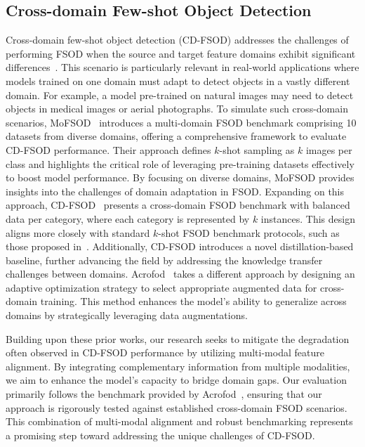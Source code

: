 \subsection{Cross-domain Few-shot Object Detection}
Cross-domain few-shot object detection (CD-FSOD) addresses the challenges of performing FSOD when the source and target feature domains exhibit significant differences~\cite{rostami2019sar,fu2025cross}. This scenario is particularly relevant in real-world applications where models trained on one domain must adapt to detect objects in a vastly different domain. For example, a model pre-trained on natural images may need to detect objects in medical images or aerial photographs.
To simulate such cross-domain scenarios, MoFSOD~\cite{Lee22Rethink} introduces a multi-domain FSOD benchmark comprising 10 datasets from diverse domains, offering a comprehensive framework to evaluate CD-FSOD performance. Their approach defines \( k \)-shot sampling as \( k \) images per class and highlights the critical role of leveraging pre-training datasets effectively to boost model performance. By focusing on diverse domains, MoFSOD provides insights into the challenges of domain adaptation in FSOD.
Expanding on this approach, CD-FSOD~\cite{Xiong2023CDFSOD} presents a cross-domain FSOD benchmark with balanced data per category, where each category is represented by \( k \) instances. This design aligns more closely with standard \( k \)-shot FSOD benchmark protocols, such as those proposed in~\cite{Wang20TFA}. Additionally, CD-FSOD introduces a novel distillation-based baseline, further advancing the field by addressing the knowledge transfer challenges between domains.
Acrofod~\cite{Gao22CDFSOD} takes a different approach by designing an adaptive optimization strategy to select appropriate augmented data for cross-domain training. This method enhances the model's ability to generalize across domains by strategically leveraging data augmentations.

Building upon these prior works, our research seeks to mitigate the degradation often observed in CD-FSOD performance by utilizing multi-modal feature alignment. By integrating complementary information from multiple modalities, we aim to enhance the model's capacity to bridge domain gaps. Our evaluation primarily follows the benchmark provided by Acrofod~\cite{Gao22CDFSOD}, ensuring that our approach is rigorously tested against established cross-domain FSOD scenarios. This combination of multi-modal alignment and robust benchmarking represents a promising step toward addressing the unique challenges of CD-FSOD.